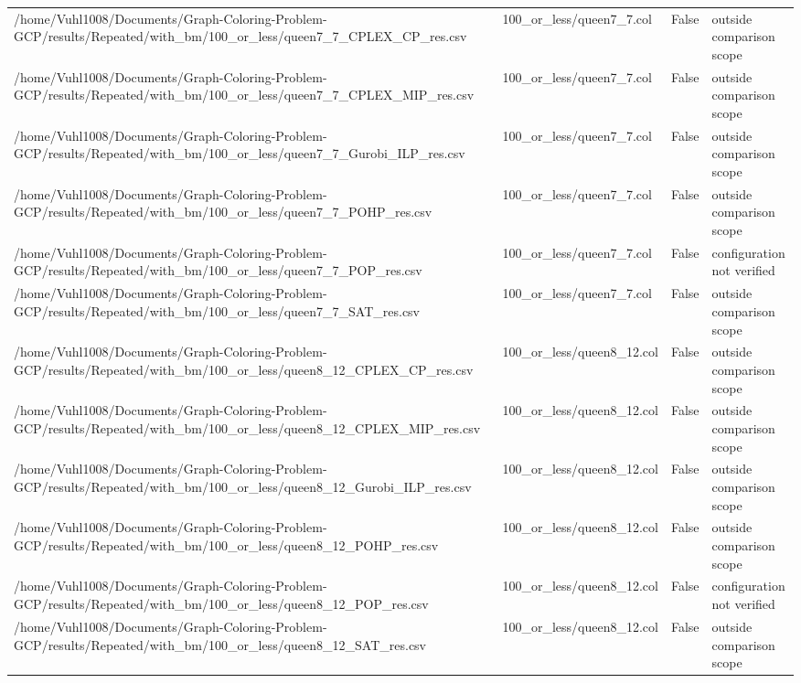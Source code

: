 \begin{table}[htbp]
\begin{tabular}{llll}
/home/Vuhl1008/Documents/Graph-Coloring-Problem-GCP/results/Repeated/with\_bm/100\_or\_less/queen7\_7\_CPLEX\_CP\_res.csv & 100\_or\_less/queen7\_7.col & False & outside comparison scope \\
/home/Vuhl1008/Documents/Graph-Coloring-Problem-GCP/results/Repeated/with\_bm/100\_or\_less/queen7\_7\_CPLEX\_MIP\_res.csv & 100\_or\_less/queen7\_7.col & False & outside comparison scope \\
/home/Vuhl1008/Documents/Graph-Coloring-Problem-GCP/results/Repeated/with\_bm/100\_or\_less/queen7\_7\_Gurobi\_ILP\_res.csv & 100\_or\_less/queen7\_7.col & False & outside comparison scope \\
/home/Vuhl1008/Documents/Graph-Coloring-Problem-GCP/results/Repeated/with\_bm/100\_or\_less/queen7\_7\_POHP\_res.csv & 100\_or\_less/queen7\_7.col & False & outside comparison scope \\
/home/Vuhl1008/Documents/Graph-Coloring-Problem-GCP/results/Repeated/with\_bm/100\_or\_less/queen7\_7\_POP\_res.csv & 100\_or\_less/queen7\_7.col & False & configuration not verified \\
/home/Vuhl1008/Documents/Graph-Coloring-Problem-GCP/results/Repeated/with\_bm/100\_or\_less/queen7\_7\_SAT\_res.csv & 100\_or\_less/queen7\_7.col & False & outside comparison scope \\
/home/Vuhl1008/Documents/Graph-Coloring-Problem-GCP/results/Repeated/with\_bm/100\_or\_less/queen8\_12\_CPLEX\_CP\_res.csv & 100\_or\_less/queen8\_12.col & False & outside comparison scope \\
/home/Vuhl1008/Documents/Graph-Coloring-Problem-GCP/results/Repeated/with\_bm/100\_or\_less/queen8\_12\_CPLEX\_MIP\_res.csv & 100\_or\_less/queen8\_12.col & False & outside comparison scope \\
/home/Vuhl1008/Documents/Graph-Coloring-Problem-GCP/results/Repeated/with\_bm/100\_or\_less/queen8\_12\_Gurobi\_ILP\_res.csv & 100\_or\_less/queen8\_12.col & False & outside comparison scope \\
/home/Vuhl1008/Documents/Graph-Coloring-Problem-GCP/results/Repeated/with\_bm/100\_or\_less/queen8\_12\_POHP\_res.csv & 100\_or\_less/queen8\_12.col & False & outside comparison scope \\
/home/Vuhl1008/Documents/Graph-Coloring-Problem-GCP/results/Repeated/with\_bm/100\_or\_less/queen8\_12\_POP\_res.csv & 100\_or\_less/queen8\_12.col & False & configuration not verified \\
/home/Vuhl1008/Documents/Graph-Coloring-Problem-GCP/results/Repeated/with\_bm/100\_or\_less/queen8\_12\_SAT\_res.csv & 100\_or\_less/queen8\_12.col & False & outside comparison scope \\

\end{tabular}
\end{table}
